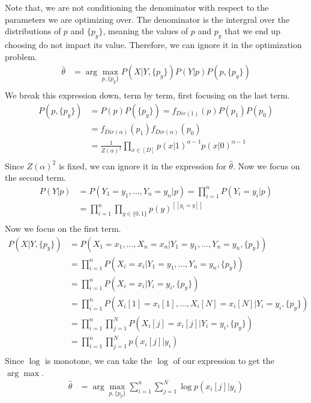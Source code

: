 \documentclass{amsart}
\theoremstyle{definition}
\begin{document}
\begin{enumerate}[(a)]
		Note that, we are not conditioning the denominator with respect to the parameters we are optimizing over.
		The denominator is the intergral over the distributions of $p$ and $\{p_y\}$, meaning the values of $p$ and $p_y$ that we end up choosing do not impact its value.
		Therefore, we can ignore it in the optimization problem.
		\begin{align*}
			\hat{\theta} &= \arg\max_{p, \{p_y\}} P(X|Y, \{p_y\})P(Y|p)P(p, \{p_y\})\\
		\end{align*}
		We break this expression down, term by term, first focusing on the last term.
		\begin{align*}
			P(p, \{p_y\}) &= P(p)P(\{p_y\}) = f_{Dir(1)}(p) P(p_1)P(p_0)\\
			&= f_{Dir(\alpha)}(p_1)f_{Dir(\alpha)}(p_0)\\
			&= \frac{1}{Z(\alpha)^2} \prod_{x \in [D]} p(x|1)^{\alpha - 1}p(x|0)^{\alpha - 1}\\
		\end{align*}
		Since $Z(\alpha)^2$ is fixed, we can ignore it in the expression for $\hat{\theta}$.
		Now we focus on the second term.
		\begin{align*}
			P(Y|p) &= P(Y_1 = y_1, \ldots, Y_n = y_n|p) = \prod_{i=1}^{n} P(Y_i = y_i|p)\\
			&= \prod_{i=1}^{n } \prod_{y \in \{0, 1\}} p(y)^{[[y_i = y]]}\\
		\end{align*}
		Now we focus on the first term.
		\begin{align*}
			P(X|Y, \{p_y\}) &= P(X_1 = x_1, \ldots, X_n = x_n|Y_1 = y_1, \ldots, Y_n = y_n, \{p_y\})\\
			&= \prod_{i=1}^{n} P(X_i = x_i|Y_1 = y_1, \ldots, Y_n = y_n, \{p_y\})\\
			&= \prod_{i=1}^{n} P(X_i = x_i|Y_i = y_i, \{p_y\})\\
			&= \prod_{i=1}^{n} P(X_i[1] = x_i[1], \ldots, X_i[N] = x_i[N]|Y_i = y_i, \{p_y\})\\
			&= \prod_{i=1}^{n} \prod_{j=1}^{N} P(X_i[j] = x_i[j]|Y_i = y_i, \{p_y\})\\
			&= \prod_{i=1}^{n} \prod_{j=1}^{N} p(x_i[j]|y_i)\\
		\end{align*}
		Since $\log$ is monotone, we can take the $\log$ of our expression to get the $\arg\max$.
		\begin{align*}
			\hat{\theta}&=\arg\max_{p, \{p_y\}} \sum_{i=1}^{n}\sum_{j=1}^{N} \log p(x_i[j]|y_i) 

\end{align*}
\end{enumerate}
\end{document}
